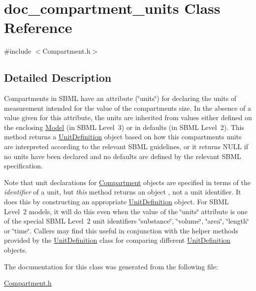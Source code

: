 \hypertarget{classdoc__compartment__units}{}\section{doc\+\_\+compartment\+\_\+units Class Reference}
\label{classdoc__compartment__units}


{\ttfamily \#include $<$Compartment.\+h$>$}



\subsection{Detailed Description}
\begin{DoxyParagraph}{}
Compartments in S\+B\+ML have an attribute (\char`\"{}units\char`\"{}) for declaring the units of measurement intended for the value of the compartment\textquotesingle{}s size. In the absence of a value given for this attribute, the units are inherited from values either defined on the enclosing \hyperlink{class_model}{Model} (in S\+B\+ML Level~3) or in defaults (in S\+B\+ML Level~2). This method returns a \hyperlink{class_unit_definition}{Unit\+Definition} object based on how this compartment\textquotesingle{}s units are interpreted according to the relevant S\+B\+ML guidelines, or it returns {\ttfamily N\+U\+LL} if no units have been declared and no defaults are defined by the relevant S\+B\+ML specification.
\end{DoxyParagraph}
Note that unit declarations for \hyperlink{class_compartment}{Compartment} objects are specified in terms of the {\itshape identifier} of a unit, but {\itshape this} method returns an object , not a unit identifier. It does this by constructing an appropriate \hyperlink{class_unit_definition}{Unit\+Definition} object. For S\+B\+ML Level~2 models, it will do this even when the value of the \char`\"{}units\char`\"{} attribute is one of the special S\+B\+ML Level~2 unit identifiers {\ttfamily \char`\"{}substance\char`\"{}}, {\ttfamily \char`\"{}volume\char`\"{}}, {\ttfamily \char`\"{}area\char`\"{}}, {\ttfamily \char`\"{}length\char`\"{}} or {\ttfamily \char`\"{}time\char`\"{}}. Callers may find this useful in conjunction with the helper methods provided by the \hyperlink{class_unit_definition}{Unit\+Definition} class for comparing different \hyperlink{class_unit_definition}{Unit\+Definition} objects. 

The documentation for this class was generated from the following file\+:\begin{DoxyCompactItemize}
\item 
\hyperlink{_compartment_8h}{Compartment.\+h}\end{DoxyCompactItemize}
